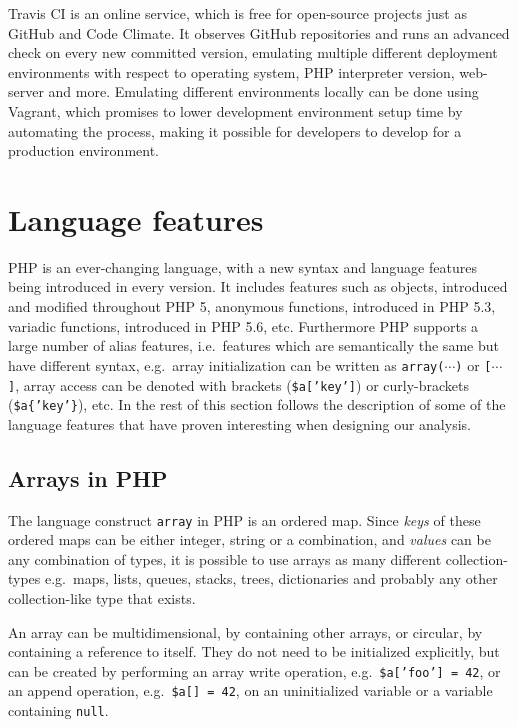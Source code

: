 Travis CI is an online service, which is free for open-source projects just as GitHub and Code Climate. It observes GitHub repositories and runs an advanced check on every new committed version, emulating multiple different deployment environments with respect to operating system, PHP interpreter version, web-server and more. Emulating different environments locally can be done using Vagrant, which promises to lower development environment setup time by automating the process, making it possible for developers to develop for a production environment.


\section{Language features}
PHP is an ever-changing language, with a new syntax and language features being introduced in every version. It includes features such as objects, introduced and modified throughout PHP 5, anonymous functions, introduced in PHP 5.3, variadic functions, introduced in PHP 5.6, etc. Furthermore PHP supports a large number of alias features, i.e.\ features which are semantically the same but have different syntax, e.g.\ array initialization can be written as \texttt{array($\cdots$)} or \texttt{[$\cdots$]}, array access can be denoted with brackets (\texttt{\$a['key']}) or curly-brackets (\texttt{\$a\{'key'\}}), etc. In the rest of this section follows the description of some of the language features that have proven interesting when designing our analysis.

\subsection{Arrays in PHP}
The language construct \texttt{array} in PHP is an ordered map. Since \emph{keys} of these ordered maps can be either integer, string or a combination, and \emph{values} can be any combination of types, it is possible to use arrays as many different collection-types e.g.\ maps, lists, queues, stacks, trees, dictionaries and probably any other collection-like type that exists. 

An array can be multidimensional, by containing other arrays, or circular, by containing a reference to itself. They do not need to be initialized explicitly, but can be created by performing an array write operation, e.g.\ \texttt{\$a['foo'] = 42}, or an append operation, e.g.\ \texttt{\$a[] = 42}, on an uninitialized variable or a variable containing \texttt{null}.

